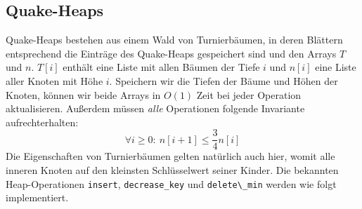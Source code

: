 \documentclass[a4paper,10pt]{article}
\begin{document}
\subsection{Quake-Heaps}
Quake-Heaps bestehen aus einem Wald von Turnierbäumen, in deren Blättern entsprechend die Einträge des Quake-Heaps gespeichert sind und den Arrays $T$ und $n$.
$T[i]$ enthält eine Liste mit allen Bäumen der Tiefe $i$ und $n[i]$ eine Liste aller Knoten mit Höhe $i$.
Speichern wir die Tiefen der Bäume und Höhen der Knoten, können wir beide Arrays in $O(1)$ Zeit bei jeder Operation aktualisieren.
Außerdem müssen \emph{alle} Operationen folgende Invariante aufrechterhalten:
\[\forall i \geq 0{:}\ n[i+1] \leq \frac{3}{4} n[i]\]
Die Eigenschaften von Turnierbäumen gelten natürlich auch hier, womit alle inneren Knoten auf den kleinsten Schlüsselwert seiner Kinder.
Die bekannten Heap-Operationen \verb!insert!, \verb!decrease_key! und \verb!delete\_min! werden wie folgt implementiert.
\end{document}
